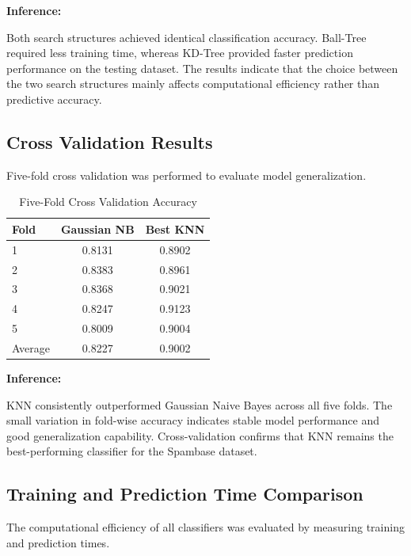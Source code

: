 \documentclass[12pt,a4paper]{article}
\begin{document}
	\textbf{Inference:}
	
	Both search structures achieved identical classification accuracy. Ball-Tree required less training time, whereas KD-Tree provided faster prediction performance on the testing dataset. The results indicate that the choice between the two search structures mainly affects computational efficiency rather than predictive accuracy.\\
	
	\subsection{Cross Validation Results}
	
	Five-fold cross validation was performed to evaluate model generalization.
	
	\begin{table}[H]
		\centering
		\caption{Five-Fold Cross Validation Accuracy}
		\begin{tabular}{lcc}
			\toprule
			Fold & Gaussian NB & Best KNN\\
			\midrule
			1 & 0.8131 & 0.8902\\
			2 & 0.8383 & 0.8961\\
			3 & 0.8368 & 0.9021\\
			4 & 0.8247 & 0.9123\\
			5 & 0.8009 & 0.9004\\
			\midrule
			Average & 0.8227 & 0.9002\\
			\bottomrule
		\end{tabular}
	\end{table}
	
	\vspace{0.3cm}
	\vspace{0.3cm}
	
	\textbf{Inference:}
	
	KNN consistently outperformed Gaussian Naive Bayes across all five folds. The small variation in fold-wise accuracy indicates stable model performance and good generalization capability. Cross-validation confirms that KNN remains the best-performing classifier for the Spambase dataset.
	
	\subsection{Training and Prediction Time Comparison}
	
	The computational efficiency of all classifiers was evaluated by measuring training and prediction times.
	
\end{document}
